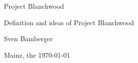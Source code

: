\begin{titlepage} 
 	\begin{center} 
		{\Huge Project Blanchwood
		\\[2ex] \small{Definition and ideas of Project Blanchwood\par } }
		\vspace{2cm} 
	 	{\large Sven Bamberger\par} 
	 	\vspace{1cm} 
	 	 Mainz, the \today 
	\end{center} 
 \end{titlepage} 